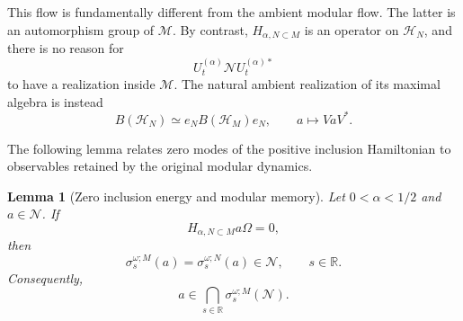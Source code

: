 \documentclass[a4paper,11pt]{article}
\newtheorem{lemma}[theorem]{Lemma}
\theoremstyle{definition}
\begin{document}
This flow is fundamentally different from the ambient modular flow.
The latter is an automorphism group of $\mathcal M$. By contrast,
$H_{\alpha,N\subset M}$ is an operator on $\mathcal H_N$, and there is
no reason for
\begin{equation}
    U_t^{(\alpha)}
    \mathcal N
    U_t^{(\alpha)*}
\end{equation}
to have a realization inside $\mathcal M$. The natural ambient realization
of its maximal algebra is instead
\begin{equation}
    B(\mathcal H_N)
    \simeq
    e_NB(\mathcal H_M)e_N,
    \qquad
    a\longmapsto VaV^* .
    \label{eq:BHN-corner}
\end{equation}

The following lemma relates zero modes of the positive inclusion Hamiltonian
to observables retained by the original modular dynamics.

\begin{lemma}[Zero inclusion energy and modular memory]
\label{lem:zero-energy-modular-memory}
Let $0<\alpha<1/2$ and $a\in\mathcal N$. If
\begin{equation}
    H_{\alpha,N\subset M}a\Omega=0,
    \label{eq:Halpha-zero-a}
\end{equation}
then
\begin{equation}
    \sigma_s^{\omega;M}(a)
    =
    \sigma_s^{\omega;N}(a)
    \in\mathcal N,
    \qquad
    s\in\mathbb R .
    \label{eq:zero-energy-intertwining}
\end{equation}
Consequently,
\begin{equation}
    a
    \in
    \bigcap_{s\in\mathbb R}
    \sigma_s^{\omega;M}(\mathcal N).
    \label{eq:zero-energy-memory}
\end{equation}
\end{lemma}
\end{document}
